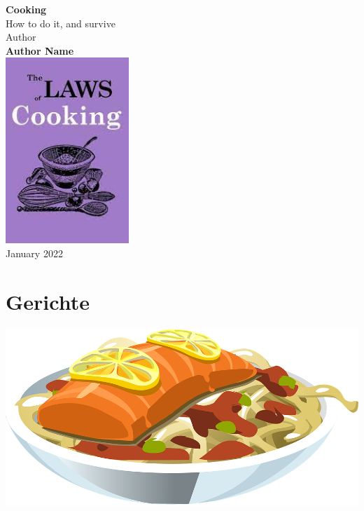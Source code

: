 \documentclass[
	12pt,
	a4paper,
	titlepage,
	oneside]{book}
\begin{document}
%
%
\frontmatter
\begin{titlepage}
\begin{center}
  \vspace*{4cm}
  \Huge{\textbf{Cooking}} \\[15pt]
  \LARGE{How to do it, and survive} \\
  \vspace{1.5cm}
  \large{Author}\\[5pt]
  \Large{\textbf{Author Name}} \\
  \vfill
  \includegraphics[width=0.35\textwidth]{Bilder/title.jpg}\\[5pt]
  \vspace{1cm}
  {January 2022}
\end{center}
\end{titlepage}

\newpage

\tableofcontents
%
%
\mainmatter

\part{Gerichte}
\includegraphics{Bilder/example.png}

  
  \newpage
  

\backmatter
\showindex
\end{document}
